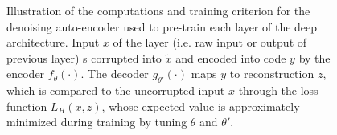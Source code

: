 \documentclass{article} %
\begin{document}
\begin{figure}[ht]
\centerline{}
\caption{Illustration of the computations and training criterion for the denoising
auto-encoder used to pre-train each layer of the deep architecture. Input $x$ of
the layer (i.e. raw input or output of previous layer)
s corrupted into $\tilde{x}$ and encoded into code $y$ by the encoder $f_\theta(\cdot)$.
The decoder $g_{\theta'}(\cdot)$ maps $y$ to reconstruction $z$, which
is compared to the uncorrupted input $x$ through the loss function
$L_H(x,z)$, whose expected value is approximately minimized during training
by tuning $\theta$ and $\theta'$.}
\label{fig:da}
\end{figure}
\end{document}
